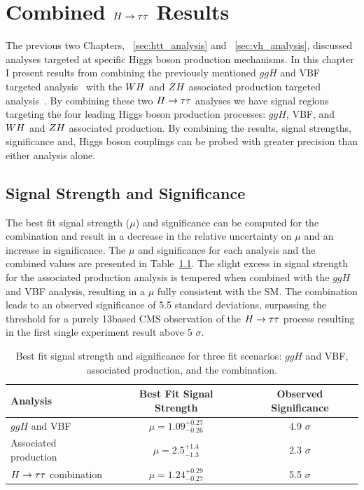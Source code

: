 \chapter{Combined $H\to\tau\tau$ Results}
\label{sec:cmb_results}

The previous two Chapters, ~\ref{sec:htt_analysis} and ~\ref{sec:vh_analysis}, discussed
analyses targeted at specific Higgs boson production mechanisms. In this chapter
I present results from combining the previously mentioned 
$ggH$ and VBF targeted analysis~\cite{cms_13TeV_htt_jhep_2017}
with the $WH$ and $ZH$ associated production targeted analysis~\cite{HIG-18-007}.
By combining these two $H\to\tau\tau$ analyses we have signal regions targeting the four leading Higgs 
boson production processes: $ggH$, VBF, and $WH$ and $ZH$ associated production. 
By combining the results, signal strengths, significance and, Higgs
boson couplings can be probed with greater precision than either analysis alone.

\section{Signal Strength and Significance}
The best fit signal strength ($\mu$) and significance can be computed for the combination and
result in a decrease in the relative uncertainty on $\mu$ and an increase
in significance. The $\mu$ and significance
for each analysis and the combined values are presented in Table~\ref{tab:cmb_mu_and_sig}.
The slight excess in signal strength for the associated production analysis is tempered
when combined with the $ggH$ and VBF analysis, resulting in a $\mu$ fully consistent 
with the SM. The combination leads to an 
observed significance of 5.5 standard deviations, surpassing the threshold for a
purely 13\TeV based CMS observation of the $H\to\tau\tau$ process resulting in the first single
experiment result above 5 $\sigma$. 

\begin{table}[htbp]
\renewcommand{\arraystretch}{1.3}
\centering
\begin{tabular}{lcc}
Analysis         &   Best Fit Signal Strength    &   Observed Significance    \\
\hline
$ggH$ and VBF             &   $\mu = 1.09 ^{+0.27} _{-0.26}$   &  4.9 $\sigma$     \\
Associated production     &   $\mu = 2.5  ^{+1.4}  _{-1.3}$    &  2.3 $\sigma$     \\
$H\to\tau\tau$ combination        &   $\mu = 1.24 ^{+0.29} _{-0.27}$   &  5.5 $\sigma$     \\
\hline
\end{tabular}
\caption{
Best fit signal strength and significance for three fit scenarios: $ggH$ and VBF,
associated production, and the combination.
}
\label{tab:cmb_mu_and_sig}
\end{table}


